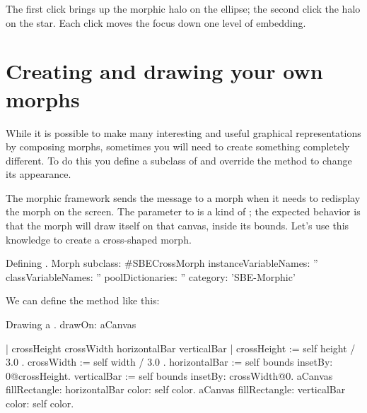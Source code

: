 \documentclass[a4paper,10pt,twoside]{book}
\begin{document}
\noindent
The first click brings up the morphic halo on the ellipse; the second click the halo on the star.
Each click moves the focus down one level of embedding.


\section{Creating and drawing your own morphs}

While it is possible to make many interesting and useful graphical representations by composing morphs, sometimes you will need to create something completely different.
To do this you define a subclass of  and override the  method to change its appearance.

The morphic framework sends the message  to a morph when it needs to redisplay the morph on the screen.
The parameter to  is a kind of ; the expected behavior is that the morph will draw itself on that canvas, inside its bounds.
Let's use this knowledge to create a cross-shaped morph.

\begin{classdef}{Defining .}
Morph subclass: #SBECrossMorph
	instanceVariableNames: ''
	classVariableNames: ''
	poolDictionaries: ''
	category: 'SBE-Morphic'
\end{classdef}

We can define the  method like this:
\begin{method}[firstDrawOn]{Drawing a .}
drawOn: aCanvas 

	| crossHeight crossWidth horizontalBar verticalBar |
	crossHeight := self height / 3.0 .
	crossWidth := self width / 3.0 .
	horizontalBar := self bounds insetBy: 0@crossHeight.
	verticalBar := self bounds insetBy: crossWidth@0.
	aCanvas fillRectangle: horizontalBar color: self color.
	aCanvas fillRectangle: verticalBar color: self color.
\end{method}
\end{document}
